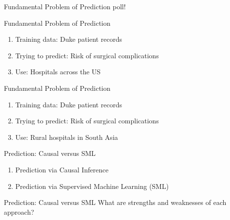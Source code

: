 \documentclass[11pt]{beamer}
\begin{document}
\begin{frame}[c]{Fundamental Problem of Prediction}
poll!
\end{frame}

\begin{frame}[c]{Fundamental Problem of Prediction}
\begin{enumerate}
  \item Training data: Duke patient records
  \item Trying to predict: Risk of surgical complications
  \item Use: Hospitals across the US
\end{enumerate}
\end{frame}

\begin{frame}[c]{Fundamental Problem of Prediction}
\begin{enumerate}
  \item Training data: Duke patient records
  \item Trying to predict: Risk of surgical complications
  \item Use: Rural hospitals in South Asia
\end{enumerate}
\end{frame}

\begin{frame}[c]{Prediction: Causal versus SML}
  \begin{enumerate}
    \item Prediction via Causal Inference
    \begin{itemize}
    \end{itemize}
    \item Prediction via Supervised Machine Learning (SML)
    \begin{itemize}
    \end{itemize}
  \end{enumerate}
\end{frame}

\begin{frame}[c]{Prediction: Causal versus SML}
What are strengths and weaknesses of each approach?
\end{frame}
\end{document}
